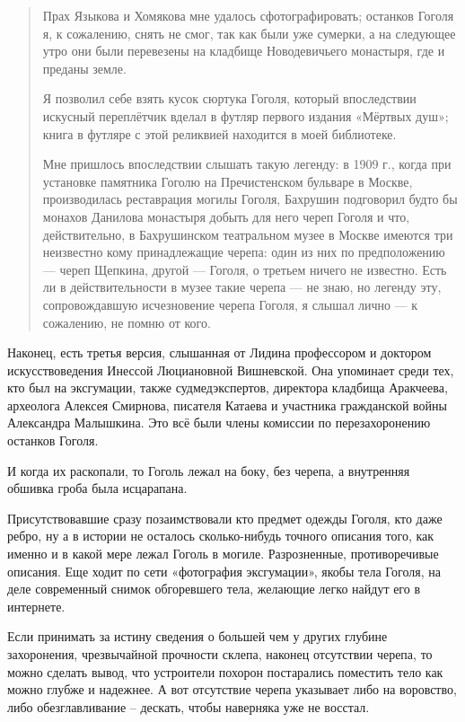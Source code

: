 \documentclass[a5paper,11pt,openany]{article}
\begin{document}
\begin{quotation}
Прах Языкова и Хомякова мне удалось сфотографировать; останков Гоголя я, к сожалению, снять не смог, так как были уже сумерки, а на следующее утро они были перевезены на кладбище Новодевичьего монастыря, где и преданы земле. 

Я позволил себе взять кусок сюртука Гоголя, который впоследствии искусный переплётчик вделал в футляр первого издания «Мёртвых душ»; книга в футляре с этой реликвией находится в моей библиотеке.

Мне пришлось впоследствии слышать такую легенду: в 1909 г., когда при установке памятника Гоголю на Пречистенском бульваре в Москве, производилась реставрация могилы Гоголя, Бахрушин подговорил будто бы монахов Данилова монастыря добыть для него череп Гоголя и что, действительно, в Бахрушинском театральном музее в Москве имеются три неизвестно кому принадлежащие черепа: один из них по предположению — череп Щепкина, другой — Гоголя, о третьем ничего не известно. Есть ли в действительности в музее такие черепа — не знаю, но легенду эту, сопровождавшую исчезновение черепа Гоголя, я слышал лично — к сожалению, не помню от кого.
\end{quotation}

Наконец, есть третья версия, слышанная от Лидина профессором и доктором искусствоведения Инессой Люциановной Вишневской. Она упоминает среди тех, кто был на эксгумации, также судмедэкспертов, директора кладбища Аракчеева, археолога Алексея Смирнова, писателя Катаева и участника гражданской войны Александра Малышкина. Это всё были члены комиссии по перезахоронению останков Гоголя.

И когда их раскопали, то Гоголь лежал на боку, без черепа, а внутренняя обшивка гроба была исцарапана.

Присутствовавшие сразу позаимствовали кто предмет одежды Гоголя, кто даже ребро, ну а в истории не осталось сколько-нибудь точного описания того, как именно и в какой мере лежал Гоголь в могиле. Разрозненные, противоречивые описания. Еще ходит по сети «фотография  эксгумации», якобы тела Гоголя, на деле современный снимок обгоревшего тела, желающие легко найдут его в интернете.

Если принимать за истину сведения о большей чем у других глубине захоронения, чрезвычайной прочности склепа, наконец отсутствии черепа, то можно сделать вывод, что устроители похорон постарались поместить тело как можно глубже и надежнее. А вот отсутствие черепа указывает либо на воровство, либо обезглавливание – дескать, чтобы наверняка уже не восстал.  
\end{document}
